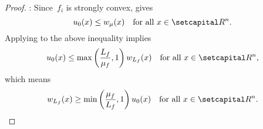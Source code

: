 \documentclass[../main]{subfiles}
\begin{document}
\begin{proof}
    :
    Since~$f_i$ is strongly convex,  gives
    \begin{equation}
        u_0(x) \le w_\mu(x) \forallcondition{x \in \setR^n}
    .\end{equation}
    Applying  to the above inequality implies
    \begin{equation}
        u_0(x) \le \max \left( \frac{L_f}{\mu_f}, 1 \right) w_{L_f}(x) \forallcondition{x \in \setR^n}
    ,\end{equation}
    which means
    \begin{equation}
        w_{L_f}(x) \ge \min \left( \frac{\mu_f}{L_f}, 1 \right) u_0(x) \forallcondition{x \in \setR^n}
    .\end{equation}


\end{proof}
\end{document}
